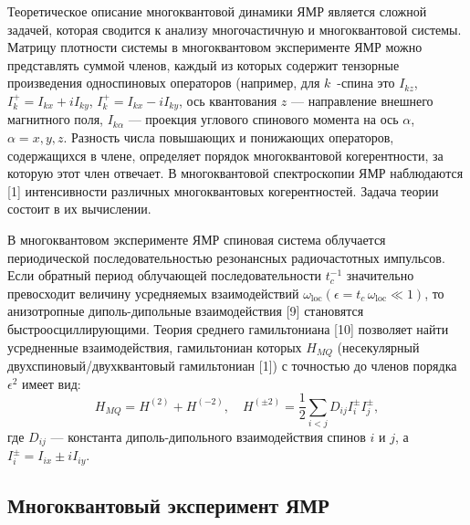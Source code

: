 Теоретическое описание многоквантовой динамики ЯМР является сложной задачей, которая сводится к анализу многочастичную и многоквантовой системы. Матрицу плотности системы в многоквантовом эксперименте ЯМР можно представлять суммой членов, каждый из которых содержит тензорные произведения односпиновых операторов
(например, для $k$~-спина это $I_{kz}$,
$I_k^+ = I_{kx} + iI_{ky}$, $I_k^+ = I_{kx} - iI_{ky}$,
ось квантования $z$ --- направление внешнего магнитного поля,
$I_{k\alpha}$ --- проекция углового спинового момента на ось $\alpha$,
$\alpha=x,y,z$. Разность числа повышающих и понижающих операторов, содержащихся в члене, определяет порядок многоквантовой когерентности, за которую этот член отвечает. В многоквантовой спектроскопии ЯМР наблюдаются [1] интенсивности различных многоквантовых когерентностей. Задача теории состоит в их вычислении.

В многоквантовом эксперименте ЯМР спиновая
система облучается периодической последовательностью резонансных радиочастотных импульсов.
Если обратный период облучающей последовательности $t_{c}^{-1}$
значительно превосходит величину усредняемых взаимодействий
$\omega_\mathrm{loc} (\epsilon = t_{c}\, \omega_\mathrm{loc} \ll 1)$,
то анизотропные диполь-дипольные взаимодействия [9] становятся быстроосциллирующими.
Теория среднего гамильтониана [10] позволяет найти усредненные взаимодействия,
гамильтониан которых $H_{MQ}$ (несекулярный двухспиновый/двухквантовый гамильтониан [1])
с точностью до членов порядка $\epsilon^2$ имеет вид:
\begin{equation}\label{eq:hmq}
    H_{MQ} = H^{(2)} + H^{(-2)},
    \quad
    H^{(\pm2)} = \frac 1 2 \sum_{i < j} D_{ij} I^\pm_i I^\pm_j,
\end{equation}
где $D_{ij}$ --- константа диполь-дипольного взаимодействия спинов $i$ и $j$, а $I^\pm_i = I_{ix} \pm iI_{iy}$.


\subsection{Многоквантовый эксперимент ЯМР}\label{sec:mq-nrm-experiment}
%

%
%
%
%
%

